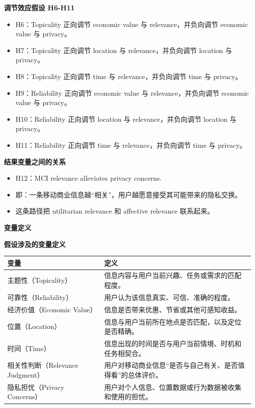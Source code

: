 \documentclass[aspectratio=169,UTF8,zihao=-4]{ctexbeamer}
\newcommand{\bigidea}[1]{
  \begin{center}
    \vspace{0.8em}
    {\LARGE \bfseries #1}
    \vspace{0.6em}
  \end{center}
}
\newcommand{\sectionpageframe}[1]{
  \begin{frame}[plain]
    \begin{center}
      \vfill
      {\Huge \bfseries #1}
      \vfill
    \end{center}
  \end{frame}
}
\begin{document}
\begin{frame}
  \bigidea{调节效应假设 H6-H11}
  \small
  \begin{itemize}
    \item H6：Topicality 正向调节 economic value 与 relevance，并负向调节 economic value 与 privacy。
    \item H7：Topicality 正向调节 location 与 relevance，并负向调节 location 与 privacy。
    \item H8：Topicality 正向调节 time 与 relevance，并负向调节 time 与 privacy。
    \item H9：Reliability 正向调节 economic value 与 relevance，并负向调节 economic value 与 privacy。
    \item H10：Reliability 正向调节 location 与 relevance，并负向调节 location 与 privacy。
    \item H11：Reliability 正向调节 time 与 relevance，并负向调节 time 与 privacy。
  \end{itemize}
\end{frame}

\begin{frame}
  \bigidea{结果变量之间的关系}
  \small
  \begin{itemize}
    \item H12：MCI relevance alleviates privacy concerns.
    \item 即：一条移动商业信息越“相关”，用户越愿意接受其可能带来的隐私交换。
    \item 这条路径把 utilitarian relevance 和 affective relevance 联系起来。
  \end{itemize}
\end{frame}

\sectionpageframe{变量定义}

\begin{frame}
  \bigidea{假设涉及的变量定义}
  \scriptsize
  \begin{tabular}{p{2.2cm}p{7.6cm}}
    \toprule
    变量 & 定义 \\
    \midrule
    主题性（Topicality） & 信息内容与用户当前兴趣、任务或需求的匹配程度。 \\
    可靠性（Reliability） & 用户认为该信息真实、可信、准确的程度。 \\
    经济价值（Economic Value） & 信息是否带来优惠、节省或其他可感知收益。 \\
    位置（Location） & 信息与用户当前所在地点是否匹配，以及定位是否精确。 \\
    时间（Time） & 信息出现的时间是否与用户当前情境、时机和任务相契合。 \\
    相关性判断（Relevance Judgment） & 用户对移动商业信息“是否与自己有关、是否值得看”的总体评价。 \\
    隐私担忧（Privacy Concerns） & 用户对个人信息、位置数据或行为数据被收集和使用的担忧。 \\
    \bottomrule
  \end{tabular}
\end{frame}
\end{document}
